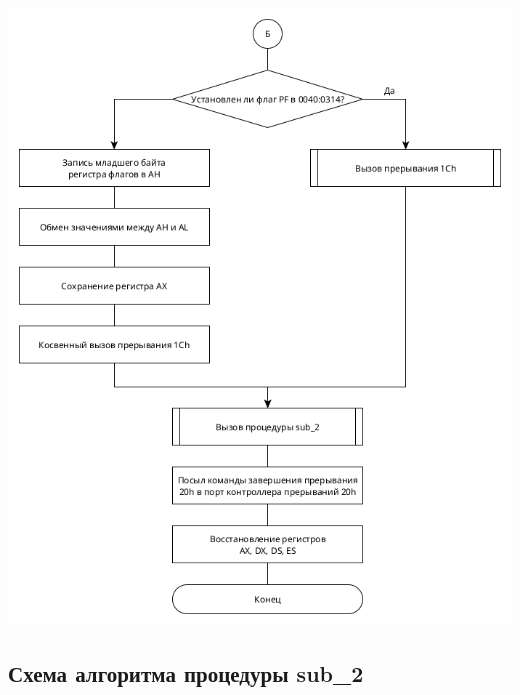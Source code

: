 \documentclass[14pt, a4paper]{article}
\begin{document}
	\begin{minipage}{0.9\linewidth}
		\includegraphics[width=\linewidth]{diagram1_3}
	\end{minipage}

	\pagebreak
	
	\subsection*{Схема алгоритма процедуры sub\_2}
	
	\bigbreak
	
\end{document}
